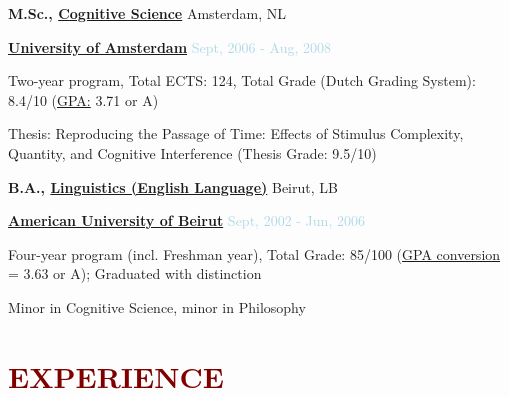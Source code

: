 \documentclass{article}
\newenvironment{outerlist}[1][\enskip\textbullet]%
        {\begin{enumerate}[#1]}{\end{enumerate}%
         \vspace{-.6\baselineskip}}
\newenvironment{innerlist}[1][\enskip\textbullet]%
        {\begin{compactenum}[#1]}{\end{compactenum}}
\begin{document}
\medskip


\textbf{M.Sc., 
        \href{http://www.csca.nl/}
             {Cognitive Science}} \hfill {Amsterdam, NL}
\begin{outerlist}

\item[] \href{http://www.uva.nl/en/home}{\textbf{University of Amsterdam}}  \hfill {\textcolor{lightblue}{Sept, 2006 - Aug, 2008}} \medskip

        \begin{innerlist}[-]
        \item Two-year program, Total ECTS: 124, Total Grade (Dutch Grading System): 8.4/10 (\href{http://en.wikipedia.org/wiki/Academic_grading_in_the_Netherlands}{GPA:} 3.71 or A) 
        \item Thesis: Reproducing the Passage of Time: Effects of Stimulus Complexity, Quantity, and Cognitive Interference (Thesis Grade: 9.5/10)        
        \end{innerlist}

\end{outerlist}

\medskip

\textbf{B.A., 
        \href{http://wwwlb.aub.edu.lb/~webengl/index.html}
             {Linguistics (English Language)}} \hfill Beirut, LB

\begin{outerlist}

\item[] \href{http://www.aub.edu.lb/}{\textbf{American University of Beirut}} \hfill {\textcolor{lightblue}{Sept, 2002 - Jun, 2006}} \bigskip
        \begin{innerlist}[-]
        \item Four-year program (incl. Freshman year), Total Grade: 85/100 (\href{http://www.aub.edu.lb/registrar/Pages/academic-information.aspx}{GPA conversion} = 3.63 or A); Graduated with distinction
        \item Minor in Cognitive Science, minor in Philosophy
        \end{innerlist}

\end{outerlist}



\section*{\textcolor{maroon}{\normalsize EXPERIENCE}}
\end{document}
